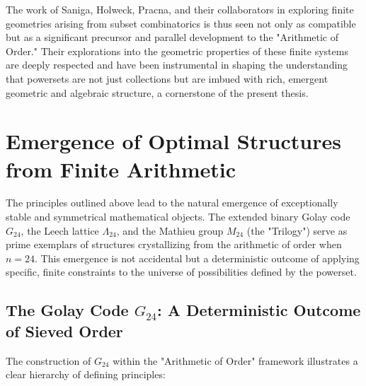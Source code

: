 \documentclass[11pt,a4paper]{article}
\begin{document}
The work of Saniga, Holweck, Pracna, and their collaborators in exploring finite geometries arising from subset combinatorics is thus seen not only as compatible but as a significant precursor and parallel development to the "Arithmetic of Order." Their explorations into the geometric properties of these finite systems are deeply respected and have been instrumental in shaping the understanding that powersets are not just collections but are imbued with rich, emergent geometric and algebraic structure, a cornerstone of the present thesis.

\section{Emergence of Optimal Structures from Finite Arithmetic}

The principles outlined above lead to the natural emergence of exceptionally stable and symmetrical mathematical objects. The extended binary Golay code $G_{24}$, the Leech lattice $\Lambda_{24}$, and the Mathieu group $M_{24}$ (the "Trilogy") serve as prime exemplars of structures crystallizing from the arithmetic of order when $n=24$. This emergence is not accidental but a deterministic outcome of applying specific, finite constraints to the universe of possibilities defined by the powerset.

\subsection{The Golay Code $G_{24}$: A Deterministic Outcome of Sieved Order}

The construction of $G_{24}$ within the "Arithmetic of Order" framework illustrates a clear hierarchy of defining principles:
\end{document}
